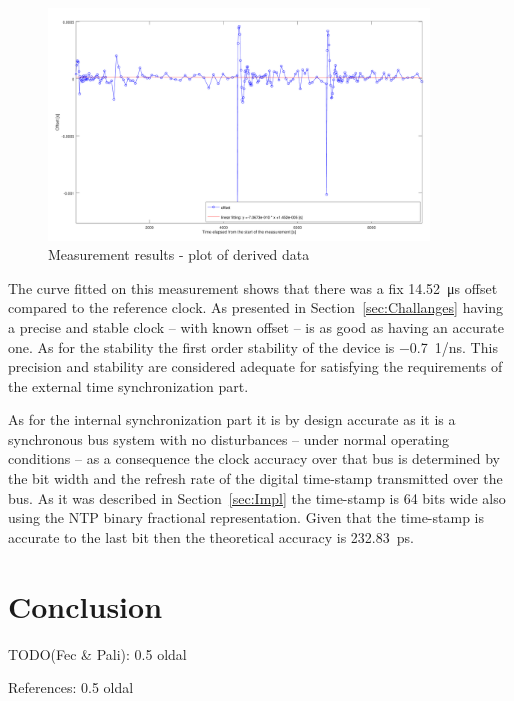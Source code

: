 \documentclass[article]{IEEEtran}
\begin{document}
\begin{figure}[!htb]
    \centering
    \includegraphics[width=0.9\textwidth]{figures_raw/plot2.png}
    \caption{Measurement results - plot of derived data}
    \label{fig:results}
\end{figure}

The curve fitted on this measurement shows that there was a fix \SI{14.52}{\micro\second} offset compared to the reference clock. As presented in Section~\ref{sec:Challanges} 
having a precise and stable clock -- with known offset -- is as good as having an accurate one. As for the stability the first order stability of the 
device is \SI{-0.7}{1/\nano\second}. This precision and stability are considered adequate for satisfying the requirements of the external time synchronization part.


As for the internal synchronization part it is by design accurate as it is a synchronous bus system with no disturbances -- under normal operating conditions -- as a
consequence the clock accuracy over that bus is determined by the bit width and the refresh rate of the digital time-stamp transmitted over the bus. As it was described in Section~\ref{sec:Impl} the 
time-stamp is 64 bits wide also using the NTP binary fractional representation. Given that the time-stamp is accurate to the last bit then the theoretical accuracy is \SI{232.83}{\pico\second}.


\section{Conclusion}

TODO(Fec \& Pali): 0.5 oldal


References: 0.5 oldal

\end{document}
